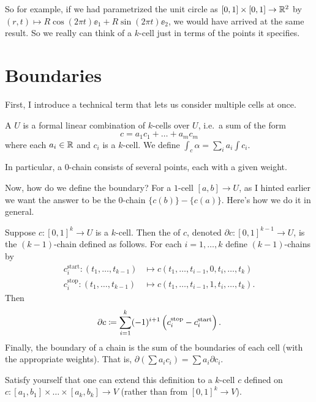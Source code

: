 So for example, if we had parametrized the unit circle as $[0,1] \times [0,1] \to \mathbb R^2$
by $(r,t) \mapsto R\cos(2\pi t) \ee_1 + R\sin(2\pi t) \ee_2$, we would have arrived at the same result.
So we really can think of a $k$-cell just in terms of the points it specifies.

\section{Boundaries}
First, I introduce a technical term that lets us consider multiple cells at once.
\begin{definition}
	A  $U$ is a formal
	linear combination of $k$-cells over $U$,
	i.e.\ a sum of the form
	\[ c = a_1 c_1 + \dots + a_m c_m \]
	where each $a_i \in \mathbb R$ and $c_i$ is a $k$-cell.
	We define $\int_c \alpha = \sum_i a_i \int c_i$.
\end{definition}
In particular, a $0$-chain consists of several points, each with a given weight.

Now, how do we define the boundary?
For a $1$-cell $[a,b] \to U$, as I hinted earlier we want the answer to be the $0$-chain $\{c(b)\}-\{c(a)\}$.
Here's how we do it in general.
\begin{definition}
	Suppose $c \colon [0,1]^k \to U$ is a $k$-cell.
	Then the  of $c$, denoted $\partial c \colon [0,1]^{k-1} \to U$,
	is the $(k-1)$-chain defined as follows.
	For each $i = 1,\dots,k$ define $(k-1)$-chains by
	\begin{align*}
		c_i^{\text{start}} \colon (t_1, \dots, t_{k-1}) &\mapsto
			c(t_1, \dots, t_{i-1}, 0, t_i, \dots, t_k) \\
		c_i^{\text{stop}} \colon (t_1, \dots, t_{k-1}) & \mapsto
			c(t_1, \dots, t_{i-1}, 1, t_i, \dots, t_k).
	\end{align*}
	Then
	\[ \partial c \coloneqq
	\sum_{i=1}^k (-1)^{i+1} \left( c_i^{\text{stop}} - c_i^{\text{start}}  \right). \]
	Finally, the boundary of a chain is the sum of the boundaries of each cell (with the appropriate weights).
	That is, $\partial(\sum a_ic_i) = \sum a_i \partial c_i$.
\end{definition}
\begin{ques}
	Satisfy yourself that one can extend this definition to
	a $k$-cell $c$ defined on $c \colon [a_1, b_1] \times \dots \times [a_k, b_k] \to V$
	(rather than from $[0,1]^k \to V$).
\end{ques}

